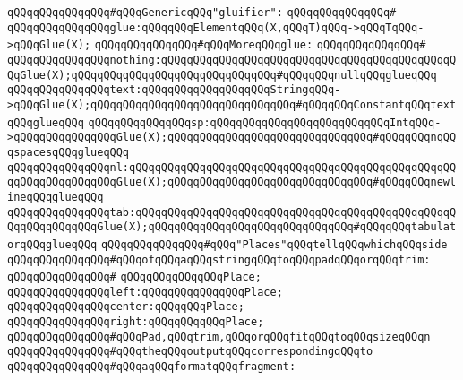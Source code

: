 \newline
\verb|qQQqqQQqqQQqqQQq#qQQqGenericqQQq"gluifier":|\newline
\verb|qQQqqQQqqQQqqQQq#|\newline
\verb|qQQqqQQqqQQqqQQqglue:qQQqqQQqElementqQQq(X,qQQqT)qQQq->qQQqTqQQq->qQQqGlue(X);|\newline
\newline
\verb|qQQqqQQqqQQqqQQq#qQQqMoreqQQqglue:|\newline
\verb|qQQqqQQqqQQqqQQq#|\newline
\verb|qQQqqQQqqQQqqQQqnothing:qQQqqQQqqQQqqQQqqQQqqQQqqQQqqQQqqQQqqQQqqQQqqQQqGlue(X);qQQqqQQqqQQqqQQqqQQqqQQqqQQqqQQq#qQQqqQQqnullqQQqglueqQQq|\newline
\verb|qQQqqQQqqQQqqQQqtext:qQQqqQQqqQQqqQQqqQQqStringqQQq->qQQqGlue(X);qQQqqQQqqQQqqQQqqQQqqQQqqQQqqQQq#qQQqqQQqConstantqQQqtextqQQqglueqQQq|\newline
\verb|qQQqqQQqqQQqqQQqsp:qQQqqQQqqQQqqQQqqQQqqQQqqQQqIntqQQq->qQQqqQQqqQQqqQQqGlue(X);qQQqqQQqqQQqqQQqqQQqqQQqqQQqqQQq#qQQqqQQqnqQQqspacesqQQqglueqQQq|\newline
\verb|qQQqqQQqqQQqqQQqnl:qQQqqQQqqQQqqQQqqQQqqQQqqQQqqQQqqQQqqQQqqQQqqQQqqQQqqQQqqQQqqQQqqQQqGlue(X);qQQqqQQqqQQqqQQqqQQqqQQqqQQqqQQq#qQQqqQQqnewlineqQQqglueqQQq|\newline
\verb|qQQqqQQqqQQqqQQqtab:qQQqqQQqqQQqqQQqqQQqqQQqqQQqqQQqqQQqqQQqqQQqqQQqqQQqqQQqqQQqqQQqGlue(X);qQQqqQQqqQQqqQQqqQQqqQQqqQQqqQQq#qQQqqQQqtabulatorqQQqglueqQQq|\newline
\newline
\verb|qQQqqQQqqQQqqQQq#qQQq"Places"qQQqtellqQQqwhichqQQqside|\newline
\verb|qQQqqQQqqQQqqQQq#qQQqofqQQqaqQQqstringqQQqtoqQQqpadqQQqorqQQqtrim:|\newline
\verb|qQQqqQQqqQQqqQQq#|\newline
\verb|qQQqqQQqqQQqqQQqPlace;|\newline
\verb|qQQqqQQqqQQqqQQqleft:qQQqqQQqqQQqqQQqPlace;|\newline
\verb|qQQqqQQqqQQqqQQqcenter:qQQqqQQqPlace;|\newline
\verb|qQQqqQQqqQQqqQQqright:qQQqqQQqqQQqPlace;|\newline
\newline
\verb|qQQqqQQqqQQqqQQq#qQQqPad,qQQqtrim,qQQqorqQQqfitqQQqtoqQQqsizeqQQqn|\newline
\verb|qQQqqQQqqQQqqQQq#qQQqtheqQQqoutputqQQqcorrespondingqQQqto|\newline
\verb|qQQqqQQqqQQqqQQq#qQQqaqQQqformatqQQqfragment:|\newline
